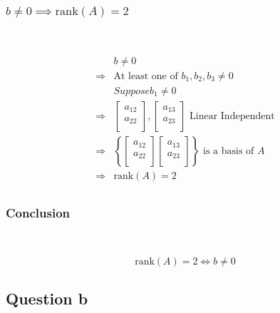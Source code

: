 \documentclass{article}
\def\rank{\text{rank}}
\begin{document}
\subsubsection{$b\ne0\implies \rank(A)=2$}

~

\begin{equation*}
    \begin{split}
        &b\ne0\\
        \Rightarrow &\text{At least one of }b_1,b_2,b_3\ne0\\
        &{Suppose }b_1\ne0\\
        \Rightarrow&\begin{bmatrix}
            a_{12}\\
            a_{22}\\
        \end{bmatrix}
        ,\begin{bmatrix}
            a_{13}\\
            a_{23}\\
        \end{bmatrix}\text{ Linear Independent}\\
        \Rightarrow&\left\{\begin{bmatrix}
            a_{12}\\
            a_{22}\\
        \end{bmatrix}\begin{bmatrix}
            a_{13}\\
            a_{23}\\
        \end{bmatrix}\right\} \text{ is a basis of }A\\
        \Rightarrow &\rank(A)=2\\
    \end{split}
\end{equation*}

\subsubsection{Conclusion}

~

\begin{equation*}
    \rank(A)=2\Leftrightarrow b\ne0
\end{equation*}

\subsection{Question b}
\end{document}
